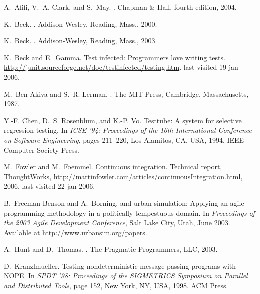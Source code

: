 \documentclass{sig-alternate-preprint}
\begin{document}
\begin{thebibliography}{10}

A.~Afifi, V.~A. Clark, and S.~May.
.
\newblock Chapman \& Hall, fourth edition, 2004.

K.~Beck.
.
\newblock Addison-Wesley, Reading, Mass., 2000.

K.~Beck.
.
\newblock Addison-Wesley, Reading, Mass., 2003.

K.~Beck and E.~Gamma.
\newblock Test infected: Programmers love writing tests.
\newblock \url{http://junit.sourceforge.net/doc/testinfected/testing.htm}.
\newblock last visited 19-jan-2006.

M.~Ben-Akiva and S.~R. Lerman.
.
\newblock The MIT Press, Cambridge, Massachusetts, 1987.

Y.-F. Chen, D.~S. Rosenblum, and K.-P. Vo.
\newblock Testtube: A system for selective regression testing.
\newblock In {\em ICSE '94: Proceedings of the 16th International Conference on
  Software Engineering}, pages 211--220, Los Alamitos, CA, USA, 1994. IEEE
  Computer Society Press.

M.~Fowler and M.~Foemmel.
\newblock Continuous integration.
\newblock Technical report, ThoughtWorks,
  \url{http://martinfowler.com/articles/continuousIntegration.html}, 2006.
\newblock last visited 22-jan-2006.

B.~Freeman-Benson and A.~Borning.
 and urban simulation: Applying an agile programming methodology
  in a politically tempestuous domain.
\newblock In {\em Proceedings of the 2003 Agile Development Conference}, Salt
  Lake City, Utah, June 2003.
\newblock Available at \url{http://www.urbansim.org/papers}.

A.~Hunt and D.~Thomas.
.
\newblock The Pragmatic Programmers, LLC, 2003.

D.~Kranzlmueller.
\newblock Testing nondeterministic message-passing programs with {NOPE}.
\newblock In {\em SPDT '98: Proceedings of the SIGMETRICS Symposium on Parallel
  and Distributed Tools}, page 152, New York, NY, USA, 1998. ACM Press.


\end{thebibliography}
\end{document}

